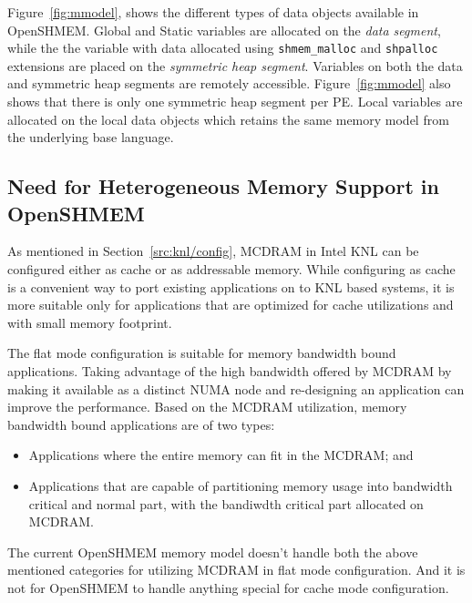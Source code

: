 Figure~\ref{fig:mmodel}, shows the different types of data objects available in
OpenSHMEM. Global and Static variables are allocated on the \emph{data segment},
while the the variable with data allocated using \texttt{shmem\_malloc} and
\texttt{shpalloc} extensions are placed on the \emph{symmetric heap segment}.
Variables on both the data and symmetric heap segments are remotely accessible.
Figure~\ref{fig:mmodel} also shows that there is only one symmetric heap segment
per PE. Local variables are allocated on the local data objects which retains the
same memory model from the underlying base language.

\subsection{Need for Heterogeneous Memory Support in OpenSHMEM}
\label{src:mmodel/drelated}
As mentioned in Section~\ref{src:knl/config}, MCDRAM in Intel KNL can be
configured either as cache or as addressable memory. While configuring as
cache is a convenient way to port existing applications on to KNL based
systems, it is more suitable only for applications that are optimized for
cache utilizations and with small memory footprint.

The flat mode configuration is suitable for memory bandwidth bound
applications. Taking advantage of the high bandwidth offered by MCDRAM by
making it available as a distinct NUMA node and re-designing an application
can improve the performance. Based on the MCDRAM utilization, memory
bandwidth bound applications are of two types:
\begin{itemize}
    \item Applications where the entire memory can fit in the MCDRAM; and
    \item Applications that are capable of partitioning memory usage into
    bandwidth critical and normal part, with the bandiwdth critical part
    allocated on MCDRAM.
\end{itemize}
The current OpenSHMEM memory model doesn't handle both the above mentioned
categories for utilizing MCDRAM in flat mode configuration. And it is not
for OpenSHMEM to handle anything special for cache mode configuration.
